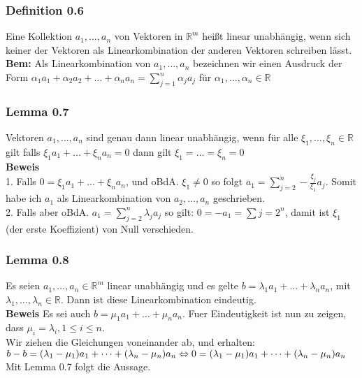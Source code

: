 \documentclass{article}
\newcommand{\lb}{\lambda}
\newcommand{\R}{\mathbb{R}}
\newcommand{\al}{\alpha}
\begin{document}
\subsubsection{Definition 0.6}
Eine Kollektion $a_1, \dots, a_n$ von Vektoren in $\R^m$ hei\ss{}t linear unabhängig, wenn sich keiner der Vektoren als Linearkombination der anderen Vektoren schreiben lässt.\\
\textbf{Bem:} Als Linearkombination von $a_1, \dots, a_n$ bezeichnen  wir einen Ausdruck der Form $\al_1a_1 + \al_2 a_2 + \dots + \al_n a_n = \sum_{j=1}^n \al_j a_j$ für $\al_1, \dots, \al_n \in \R$

\subsubsection{Lemma 0.7}
Vektoren $a_1, \dots, a_n$ sind genau dann linear unabhängig, wenn für alle $\xi_1, \dots, \xi_n \in\R$ gilt falls $\xi_1a_1 + \dots + \xi_na_n = 0$  dann gilt $\xi_1 = \dots = \xi_n = 0$\\
\textbf{Beweis}\\
1. Falls $0 = \xi_1 a_1 + \dots + \xi_n a_n$, und oBdA. $\xi_1 \neq 0$ so folgt $a_1 = \sum_{j=2}^n -\frac{\xi_j}{\xi_1} a_j$. Somit habe ich $a_1$ als Linearkombination von $a_2, \dots, a_n$ geschrieben.\\
2. Falls aber oBdA. $a_1 = \sum_{j=2}^n \lb_j a_j$ so gilt: $0 = -a_1 = \sum{j=2}^n$, damit ist $\xi_1$ (der erste Koeffizient) von Null verschieden.

\subsubsection{Lemma 0.8}
Es seien $a_1, \dots, a_n \in \R^m$  linear unabhängig und es gelte $b = \lb_1a_1 + \dots + \lb_n a_n$, mit $\lb_1, \dots, \lb_n \in \R$. Dann ist diese Linearkombination eindeutig.\\
\textbf{Beweis} Es sei auch $b = \mu_1 a_1 + \dots + \mu_n a_n$. Fuer Eindeutigkeit ist nun zu zeigen, dass $\mu_i = \lb_i, 1 \le i \le n$.\\
Wir ziehen die Gleichungen voneinander ab, und erhalten:\\
$
b - b= (\lb_1 - \mu_1) a_1 + \dots + (\lb_n - \mu_n) a_n\\
\Leftrightarrow 0 = (\lb_1 - \mu_1) a_1 + \dots + (\lb_n - \mu_n) a_n\\
$
Mit Lemma 0.7 folgt die Aussage.
\end{document}
